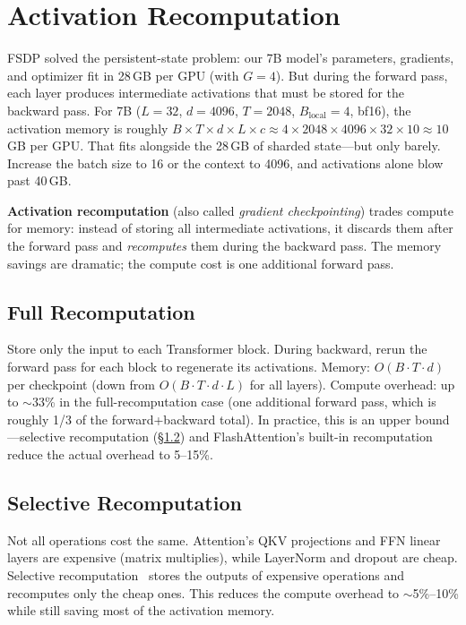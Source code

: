 \section{Activation Recomputation}
\label{sec:activation-recomputation}

FSDP solved the persistent-state problem: our 7B model's parameters, gradients, and optimizer fit in 28\,GB per GPU (with $G = 4$). But during the forward pass, each layer produces intermediate activations that must be stored for the backward pass. For 7B ($L = 32$, $d = 4096$, $T = 2048$, $B_{\text{local}} = 4$, bf16), the activation memory is roughly $B \times T \times d \times L \times c \approx 4 \times 2048 \times 4096 \times 32 \times 10 \approx 10$\,GB per GPU. That fits alongside the 28\,GB of sharded state---but only barely. Increase the batch size to 16 or the context to 4096, and activations alone blow past 40\,GB.

\textbf{Activation recomputation} (also called \emph{gradient checkpointing}) trades compute for memory: instead of storing all intermediate activations, it discards them after the forward pass and \emph{recomputes} them during the backward pass. The memory savings are dramatic; the compute cost is one additional forward pass.

\subsection{Full Recomputation}

Store only the input to each Transformer block. During backward, rerun the forward pass for each block to regenerate its activations. Memory: $O(B \cdot T \cdot d)$ per checkpoint (down from $O(B \cdot T \cdot d \cdot L)$ for all layers). Compute overhead: up to $\sim$33\% in the full-recomputation case (one additional forward pass, which is roughly 1/3 of the forward+backward total). In practice, this is an upper bound---selective recomputation (\S\ref{sec:selective-recompute}) and FlashAttention's built-in recomputation reduce the actual overhead to 5--15\%.

\subsection{Selective Recomputation}
\label{sec:selective-recompute}

Not all operations cost the same. Attention's QKV projections and FFN linear layers are expensive (matrix multiplies), while LayerNorm and dropout are cheap. Selective recomputation~\cite{korthikanti2023reducing} stores the outputs of expensive operations and recomputes only the cheap ones. This reduces the compute overhead to $\sim$5\%--10\% while still saving most of the activation memory.

